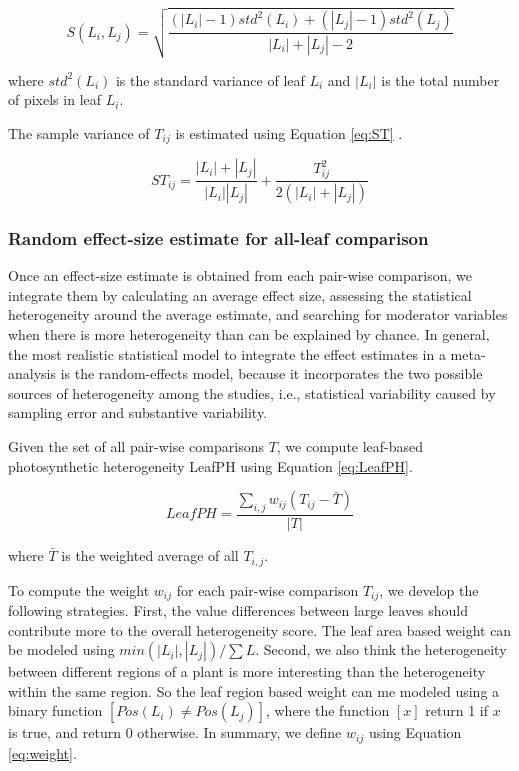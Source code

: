 \documentclass[times,11pt]{article}
\begin{document}
{\begin{equation}\label{eq:S}
S(L_i, L_j) = \sqrt{\frac{(|L_i|-1)std^2(L_i)+(|L_j|-1)std^2(L_j)}{|L_i|+|L_j|-2}}
\end{equation}

\noindent where $std^2(L_i)$ is the standard variance of leaf $L_i$ and $|L_i|$ is the total number of pixels in leaf $L_i$.

The sample variance of $T_{ij}$ is estimated using Equation \ref{eq:ST} \cite{hedges1998fixed}.

\begin{equation}\label{eq:ST}
ST_{ij} = \frac{|L_i|+|L_j|}{|L_i||L_j|}+\frac{T_{ij}^2}{2(|L_i|+|L_j|)}
\end{equation}

\subsubsection{Random effect-size estimate for all-leaf comparison}

Once an effect-size estimate is obtained from each pair-wise comparison, we integrate them by calculating an average effect size, assessing the statistical heterogeneity around the average estimate, and searching for moderator variables when there is more heterogeneity than can be explained by chance. In general, the most realistic statistical model to integrate the effect estimates in a meta-analysis is the
random-effects model, because it incorporates the two possible sources of heterogeneity among the studies, i.e., statistical variability caused by sampling error and substantive variability.

Given the set of all pair-wise comparisons $T$, we compute leaf-based photosynthetic heterogeneity LeafPH using Equation \ref{eq:LeafPH}.

\begin{equation}\label{eq:LeafPH}
LeafPH = \frac{\sum_{i,j} w_{ij}(T_{ij}-\bar{T})}{|T|}
\end{equation}

\noindent where $\bar{T}$ is the weighted average of all $T_{i,j}$.

To compute the weight $w_{ij}$ for each pair-wise comparison $T_{ij}$, we develop the following strategies. First, the value differences between large leaves should contribute more to the overall heterogeneity score. The leaf area based weight can be modeled using $min(|L_i|, |L_j|)/\sum L$. Second, we also think the heterogeneity between different regions of a plant is more interesting than the heterogeneity within the same region. So the leaf region based weight can me modeled using a binary function $[Pos(L_i)\neq Pos(L_j)]$, where the function $[x]$ return 1 if $x$ is true, and return 0 otherwise. In summary, we define $w_{ij}$ using Equation \ref{eq:weight}.

}
\end{document}
